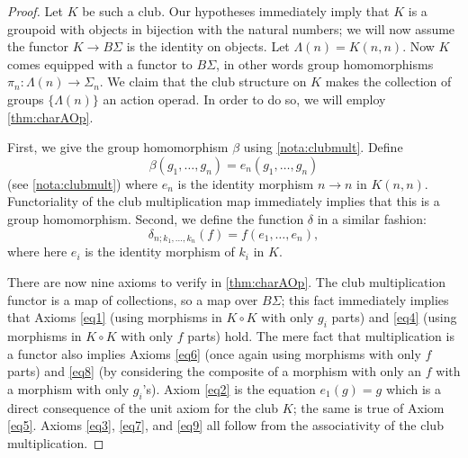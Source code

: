 \begin{proof}
Let $K$ be such a club. Our hypotheses immediately imply that $K$ is a groupoid with objects in bijection with the natural numbers; we will now assume the functor $K \rightarrow B\Sigma$ is the identity on objects. Let $\Lambda(n) = K(n,n)$. Now $K$ comes equipped with a functor to $B\Sigma$, in other words group homomorphisms $\pi_{n} \colon \Lambda(n) \rightarrow \Sigma_{n}$. We claim that the club structure on $K$ makes the collection of groups $\{ \Lambda(n) \}$ an action operad. In order to do so, we will employ \cref{thm:charAOp}.

First, we give the group homomorphism $\beta$ using \cref{nota:clubmult}. Define
  \[
    \beta(g_{1}, \ldots, g_{n}) = e_{n}(g_{1}, \ldots, g_{n})
  \]
 (see \ref{nota:clubmult}) where $e_{n}$ is the identity morphism $n \rightarrow n$ in $K(n,n)$. Functoriality of the club multiplication map immediately implies that this is a group homomorphism. Second, we define the function $\delta$ in a similar fashion:
  \[
    \delta_{n; k_{1}, \ldots, k_{n}}(f) = f(e_{1}, \ldots, e_{n}),
  \]
where here $e_{i}$ is the identity morphism of $k_{i}$ in $K$.

There are now nine axioms to verify in \cref{thm:charAOp}. The club multiplication functor is a map of collections, so a map over $B\Sigma$; this fact immediately implies that Axioms \eqref{eq1} (using morphisms in $K \circ K$ with only $g_{i}$ parts) and \eqref{eq4} (using morphisms in $K \circ K$ with only $f$ parts) hold. The mere fact that multiplication is a functor also implies Axioms \eqref{eq6} (once again using morphisms with only $f$ parts) and \eqref{eq8} (by considering the composite of a morphism with only an $f$ with a morphism with only $g_{i}$'s). Axiom \eqref{eq2} is the equation $e_{1}(g) = g$ which is a direct consequence of the unit axiom for the club $K$; the same is true of Axiom \eqref{eq5}. Axioms \eqref{eq3}, \eqref{eq7},  and \eqref{eq9} all follow from the associativity of the club multiplication.


\end{proof}
